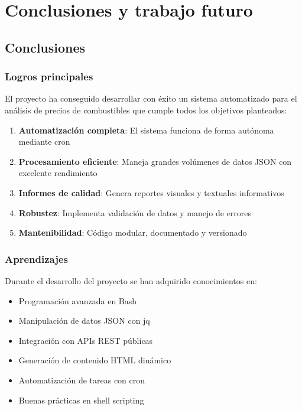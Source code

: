 \chapter{Conclusiones y trabajo futuro}

\section{Conclusiones}

\subsection{Logros principales}

El proyecto ha conseguido desarrollar con éxito un sistema automatizado para el análisis de precios de combustibles que cumple todos los objetivos planteados:

\begin{enumerate}
  \item \textbf{Automatización completa}: El sistema funciona de forma autónoma mediante cron
  \item \textbf{Procesamiento eficiente}: Maneja grandes volúmenes de datos JSON con excelente rendimiento
  \item \textbf{Informes de calidad}: Genera reportes visuales y textuales informativos
  \item \textbf{Robustez}: Implementa validación de datos y manejo de errores
  \item \textbf{Mantenibilidad}: Código modular, documentado y versionado
\end{enumerate}

\subsection{Aprendizajes}

Durante el desarrollo del proyecto se han adquirido conocimientos en:

\begin{itemize}
  \item Programación avanzada en Bash
  \item Manipulación de datos JSON con jq
  \item Integración con APIs REST públicas
  \item Generación de contenido HTML dinámico
  \item Automatización de tareas con cron
  \item Buenas prácticas en shell scripting
\end{itemize}

